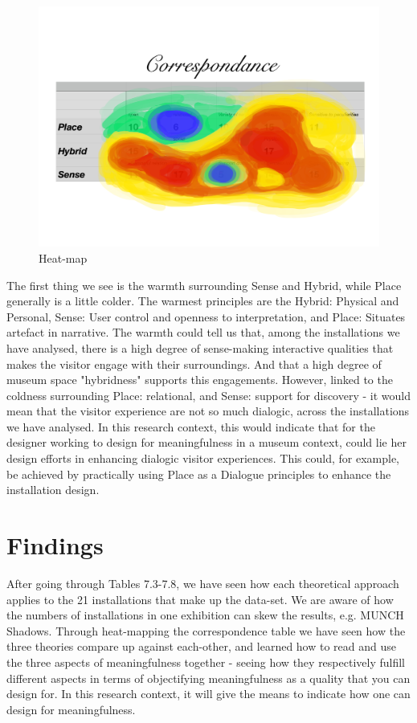 \begin{figure}[H]
    \centering
    \includegraphics[width=13cm]{pictures/analysis/heat_map_new.png}
    \caption{Heat-map}
\end{figure}

The first thing we see is the warmth surrounding Sense and Hybrid, while Place generally is a little colder. The warmest principles are the Hybrid: Physical and Personal, Sense: User control and openness to interpretation, and Place: Situates artefact in narrative. The warmth could tell us that, among the installations we have analysed, there is a high degree of sense-making interactive qualities that makes the visitor engage with their surroundings. And that a high degree of museum space "hybridness" supports this engagements. However, linked to the coldness surrounding Place: relational, and Sense: support for discovery - it would mean that the visitor experience are not so much dialogic, across the installations we have analysed. In this research context, this would indicate that for the designer working to design for meaningfulness in a museum context, could lie her design efforts in enhancing dialogic visitor experiences. This could, for example, be achieved by practically using Place as a Dialogue principles to enhance the installation design.

\section{Findings}
After going through Tables 7.3-7.8, we have seen how each theoretical approach applies to the 21 installations that make up the data-set. We are aware of how the numbers of installations in one exhibition can skew the results, e.g. MUNCH Shadows. Through heat-mapping the correspondence table we have seen how the three theories compare up against each-other, and learned how to read and use the three aspects of meaningfulness together - seeing how they respectively fulfill different aspects in terms of objectifying meaningfulness as a quality that you can design for. In this research context, it will give the means to indicate how one can design for meaningfulness. 

